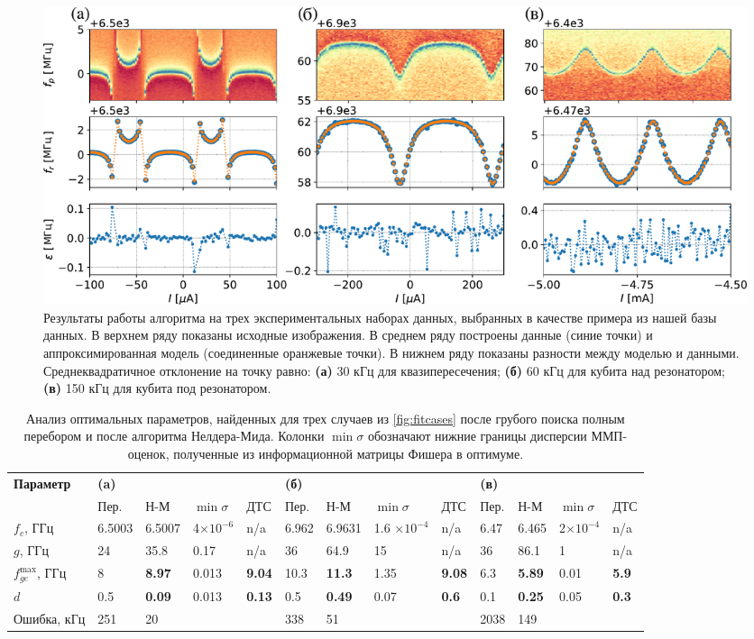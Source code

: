 \documentclass[14pt, a4paper]{extreport}
\numberwithin{equation}{section}
\begin{document}
\begin{figure}
	\centering
	\includegraphics[width=1\linewidth]{Pictures/fit_cases}
	\caption{Результаты работы алгоритма на трех экспериментальных наборах данных, выбранных в качестве примера из нашей базы данных. В верхнем ряду показаны исходные изображения. В среднем ряду построены данные (синие точки) и аппроксимированная модель (соединенные оранжевые точки). В нижнем ряду показаны разности между моделью и данными. Среднеквадратичное отклонение на точку равно: \textbf{(а)} 30 кГц для квазипересечения; \textbf{(б)} 60 кГц для кубита над резонатором; \textbf{(в)} 150 кГц для кубита под резонатором.}
	\label{fig:fitcases}
\end{figure}

\begin{table}
	\centering
		\renewcommand{\arraystretch}{1.2}
		\setlength{\tabcolsep}{4pt}
		\footnotesize{
		
		\hspace*{-0cm}\begin{tabular}{*{13}{l}} \toprule
			\multirow{2}{*}{\textbf{Параметр}} & 
			\multicolumn{4}{l}{\textbf{(a)}} & 
			\multicolumn{4}{l}{\textbf{(б)}} & \multicolumn{4}{l}{\textbf{(в)}}\\
			& Пер. & Н-М & $\min \sigma$ & ДТС  & Пер. & Н-М & $\min \sigma$ & ДТС  & Пер. & Н-М & $\min \sigma$ & ДТС  \\
			\hline
			$f_c$, ГГц &6.5003 & 6.5007 &  4$\times 10^{-6}$ & n/a & 6.962 & 6.9631 & 1.6 $\times 10^{-4}$  & n/a &  6.47 & 6.465& 2$\times 10^{-4}$ & n/a\\ 
			$g$, ГГц & 24 & 35.8 & 0.17 & n/a & 36 & 64.9 & 15 & n/a & 36 & 86.1& 1 &n/a\\
			$f_{ge}^\text{max}$, ГГц & 8 &\textbf{8.97} & 0.013 & \textbf{9.04} &10.3& \textbf{11.3}& 1.35 & \textbf{9.08}& 6.3& \textbf{5.89}&0.01&\textbf{5.9}\\
			$d$ &0.5& \textbf{0.09}& 0.013& \textbf{0.13} &0.5&\textbf{0.49} &0.07&\textbf{0.6}&0.1& \textbf{0.25} & 0.05 &\textbf{0.3} \\\hline
			Ошибка, кГц & 251 & 20 && &338& 51 & & &2038& 149&&\\
			\bottomrule
		\end{tabular} }
	\caption{Анализ оптимальных параметров, найденных для трех случаев из \autoref{fig:fitcases} после грубого поиска полным перебором и после алгоритма Нелдера-Мида. Колонки $\min \sigma$ обозначают нижние границы дисперсии ММП-оценок, полученные из информационной матрицы Фишера в оптимуме.}
	\label{tab:sts_results}
\end{table}
\end{document}
